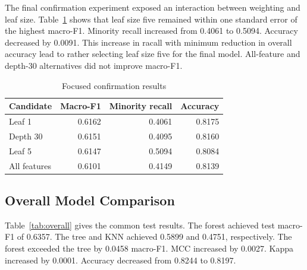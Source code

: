 \documentclass[conference]{IEEEtran}
\begin{document}
The final confirmation experiment exposed an interaction between weighting and leaf size. Table~\ref{tab:confirm} shows that leaf size five remained within one standard error of the highest macro-F1. Minority recall increased from 0.4061 to 0.5094. Accuracy decreased by 0.0091. This increase in racall with minimum reduction in overall accuracy lead to rather selecting leaf size five for the final model. All-feature and depth-30 alternatives did not improve macro-F1.

\begin{table}[ht]
\centering
\caption{Focused confirmation results}
\label{tab:confirm}
\begin{tabular}{lrrr}
\toprule
Candidate & Macro-F1 & Minority recall & Accuracy\\
\midrule
Leaf 1 & 0.6162 & 0.4061 & 0.8175\\
Depth 30 & 0.6151 & 0.4095 & 0.8160\\
Leaf 5 & 0.6147 & 0.5094 & 0.8084\\
All features & 0.6101 & 0.4149 & 0.8139\\
\bottomrule
\end{tabular}
\end{table}

\subsection{Overall Model Comparison}

Table~\ref{tab:overall} gives the common test results. The forest achieved test macro-F1 of 0.6357. The tree and KNN achieved 0.5899 and 0.4751, respectively. The forest exceeded the tree by 0.0458 macro-F1. MCC increased by 0.0027. Kappa increased by 0.0001. Accuracy decreased from 0.8244 to 0.8197.

\begin{table}[ht]
\centering
\caption{Cross-validation and held-out test performance}
\label{tab:overall}
\end{table}
\end{document}
